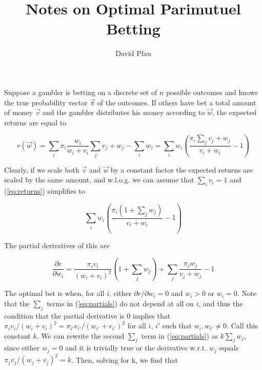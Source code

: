 \documentclass[11pt]{article}
\title{Notes on Optimal Parimutuel Betting}
\author{David Pfau}
\begin{document}
\maketitle

Suppose a gambler is betting on a discrete set of $n$ possible outcomes and knows the true probability vector $\vec{\pi}$ of the outcomes.  If others have bet a total amount of money $\vec{v}$ and the gambler distributes his money according to $\vec{w}$, the expected returns are equal to 

\begin{equation}
r(\vec{w}) = \sum_i \pi_i \frac{w_i}{w_i + v_i} \sum_{j} v_j + w_j - \sum_i w_i = \sum_i w_i \left( \frac{\pi_i \sum_j v_j + w_j}{v_i + w_i} - 1\right)
\label{eq:returns}
\end{equation}

Clearly, if we scale both $\vec{v}$ and $\vec{w}$ by a constant factor the expected returns are scaled by the same amount, and w.l.o.g. we can assume that $\sum_i v_i = 1$ and (\ref{eq:returns}) simplifies to 

\begin{equation}
 \sum_i w_i \left( \frac{\pi_i (1+ \sum_j w_j)}{v_i + w_i} - 1\right)
\label{eq:normal_returns}
\end{equation}

The partial derivatives of this are

\begin{equation}
\frac{\partial r}{\partial w_i}=\frac{\pi_i v_i}{(w_i + v_i)^2}\left(1+\sum_j w_j\right) + \sum_j \frac{\pi_j w_j}{v_j + w_j} - 1
\label{eq:partials}
\end{equation}

The optimal bet is when, for all $i$, either $\partial r/\partial w_i = 0$ and $w_i > 0$ or $w_i = 0$.  Note that the $\sum_j$ terms in (\ref{eq:partials}) do not depend at all on $i$, and thus the condition that the partial derivative is 0 implies that $\pi_i v_i/(w_i+v_i)^2 = \pi_{i'} v_{i'}/(w_{i'} + v_{i'})^2$ for all $i$, $i'$ such that $w_i, w_{i'} \ne 0$.  Call this constant $k$.  We can rewrite the second $\sum_j$ term in (\ref{eq:partials}) as $k\sum_j w_j$, since either $w_j = 0$ and it is trivially true or the derivative w.r.t. $w_j$ equals $\pi_j v_j/(w_j + v_j)^2 = k$.  Then, solving for k, we find that
\end{document}
